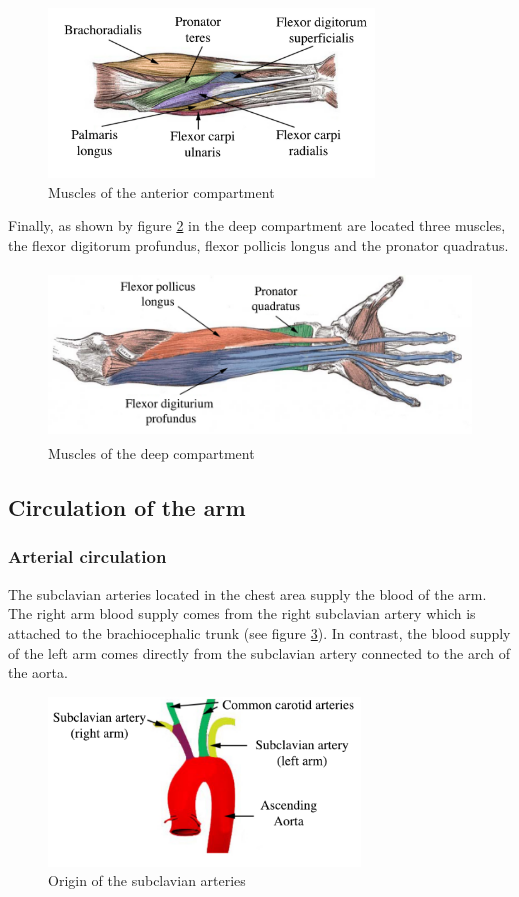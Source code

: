 \begin{figure}[!htpb]
	\centering
	\includegraphics[height=4.5cm,keepaspectratio]{figure16}
	\caption{Muscles of the anterior compartment}
	\label{fig:forearm anterior}
\end{figure}	

Finally, as shown by figure \ref{fig:forearm deep} in the deep compartment are located three muscles, the flexor digitorum profundus, flexor pollicis longus and the pronator quadratus.

\begin{figure}[!htpb]
	\centering
	\includegraphics[height=4.5cm,keepaspectratio]{figure17}
	\caption{Muscles of the deep compartment}
	\label{fig:forearm deep}
\end{figure}

\subsection{Circulation of the arm}
\subsubsection{Arterial circulation}
The subclavian arteries located in the chest area supply the blood of the arm.  The right arm blood supply comes from the right subclavian artery which is attached to the brachiocephalic trunk (see figure \ref{fig:subcalvian}). In contrast, the blood supply of the left arm comes directly from the subclavian artery connected to the arch of the aorta. 

\begin{figure}[!htpb]
	\centering
	\includegraphics[height=4.5cm,keepaspectratio]{figure18}
	\caption{Origin of the subclavian arteries}
	\label{fig:subcalvian}
\end{figure}

